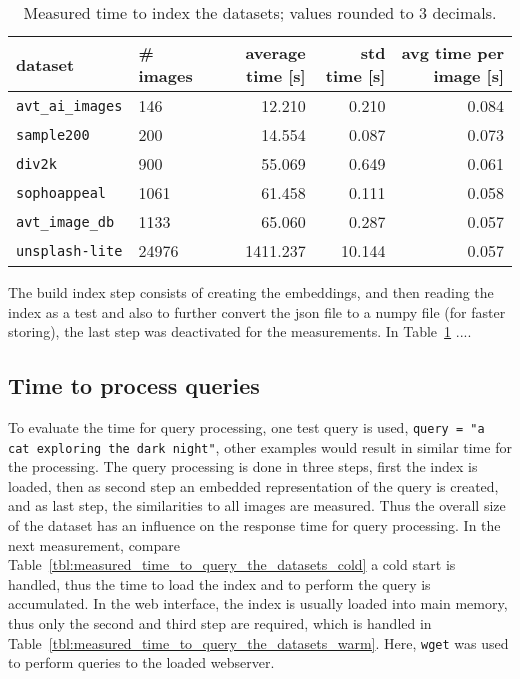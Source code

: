 \documentclass{article}
\begin{document}
\begin{table}[htb!]
\centering
\caption{Measured time to index the datasets; values rounded to 3 decimals.}
\label{tbl:measured_time_to_index_the_datasets_}
\begin{tabular}{llrrr}
\toprule
dataset                  & \# images & average time [s] & std time [s] & avg time per image [s] \\
\midrule
\texttt{avt\_ai\_images} & 146       & 12.210            & 0.210         & 0.084 \\
\texttt{sample200}       & 200       & 14.554           & 0.087        & 0.073 \\
\texttt{div2k}           & 900       & 55.069           & 0.649        & 0.061 \\
\texttt{sophoappeal}     & 1061      & 61.458           & 0.111        & 0.058 \\
\texttt{avt\_image\_db}  & 1133      & 65.060            & 0.287        & 0.057 \\
\texttt{unsplash-lite}   & 24976     & 1411.237         & 10.144       & 0.057 \\
\bottomrule
\end{tabular}
\end{table}







The build index step consists of creating the embeddings, and then reading the index as a test and also to further convert the json file to a numpy file (for faster storing), the last step was deactivated for the measurements.
In Table~\ref{tbl:measured_time_to_index_the_datasets_} ....

\subsection{Time to process queries}
To evaluate the time for query processing, one test query is used, \texttt{query = "a cat exploring the dark night"}, other examples would result in similar time for the processing.
The query processing is done in three steps, first the index is loaded, then as second step an embedded representation of the query is created, and as last step, the similarities to all images are measured.
Thus the overall size of the dataset has an influence on the response time for query processing.
In the next measurement, compare Table~\ref{tbl:measured_time_to_query_the_datasets_cold} a cold start is handled, thus the time to load the index and to perform the query is accumulated.
In the web interface, the index is usually loaded into main memory, thus only the second and third step are required, which is handled in Table~\ref{tbl:measured_time_to_query_the_datasets_warm}.
Here, \texttt{wget} was used to perform queries to the loaded webserver.
\end{document}
